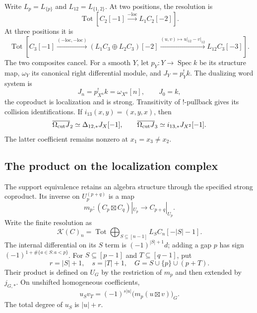 Write $L_p=L_{\{p\}}$ and $L_{12}=L_{\{1,2\}}$. At two positions,
the resolution is
\[
 \operatorname{Tot}[C_2[-1]\xrightarrow{-\mathrm{loc}}L_1C_2[-2]].
\]
At three positions it is
\begin{equation}\label{cycuts:eq:three-cube}
 \operatorname{Tot}\left[
 C_3[-1]\xrightarrow{(-\mathrm{loc},-\mathrm{loc})}
 (L_1C_3\oplus L_2C_3)[-2]
 \xrightarrow{(u,v)\mapsto u|_{12}-v|_{12}}L_{12}C_3[-3]
 \right].
\end{equation}
The two composites cancel. For a smooth $Y$, let $p_Y:Y\to\operatorname{Spec}k$
be its structure map, $\omega_Y$ its canonical right differential
module, and $J_Y=p_Y^!k$. The dualizing word system is
\begin{equation}\label{cycuts:eq:J-word}
 J_n=p_{X^n}^!k=\omega_{X^n}[n],\qquad J_0=k,
\end{equation}
the coproduct is localization and is strong. Transitivity of $!$-pullback
gives its collision identifications. If $i_{13}(x,y)=(x,y,x)$, then
\begin{equation}\label{cycuts:eq:J-support}
 \overline{\Omega_{\mathrm{cut}} J}_2\simeq\Delta_{12,*}J_X[-1],
 \qquad
 \overline{\Omega_{\mathrm{cut}} J}_3\simeq i_{13,*}J_{X^2}[-1].
\end{equation}
The latter coefficient remains nonzero at $x_1=x_3\ne x_2$.

\subsection{The product on the localization complex}

The support equivalence retains an algebra structure through the
specified strong coproduct. Its inverse on $U_p^{(p+q)}$ is a map
\[
 m_p:(C_p\boxtimes C_q)|_{U_p}\longrightarrow C_{p+q}|_{U_p}.
\]
Write the finite resolution as
\[
 \mathcal K(C)_n=
 \operatorname{Tot}\!\bigoplus_{S\subseteq[n-1]}L_SC_n[-|S|-1].
\]
The internal differential on its $S$ term is $(-1)^{|S|+1}d$;
adding a gap $p$ has sign $(-1)^{1+\#\{a\in S:a<p\}}$.
For $S\subseteq[p-1]$ and $T\subseteq[q-1]$, put
\[
 r=|S|+1,\quad s=|T|+1,\quad
 G=S\cup\{p\}\cup(p+T).
\]
Their product is defined on $U_G$ by the restriction of $m_p$ and
then extended by $j_{G,*}$. On unshifted homogeneous coefficients,
\begin{equation}\label{cycuts:eq:resolution-product}
 u_Sv_T=(-1)^{s|u|}\bigl(m_p(u\boxtimes v)\bigr)_G.
\end{equation}
The total degree of $u_S$ is $|u|+r$.

